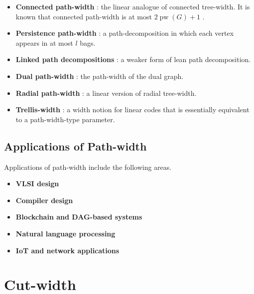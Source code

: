 \documentclass[10pt]{book}
\theoremstyle{definition}
\DeclareMathOperator{\pw}{pw}
\begin{document}
\begin{itemize}
    \item \textbf{Connected path-width} \cite{316}: the linear analogue of connected tree-width.  
    It is known that connected path-width is at most \(2\pw(G)+1\) \cite{dereniowski2012pathwidth}.

    \item \textbf{Persistence path-width} \cite{317}: a path-decomposition in which each vertex appears in at most \(l\) bags.

    \item \textbf{Linked path decompositions} \cite{362}: a weaker form of lean path decomposition.

    \item \textbf{Dual path-width} \cite{425}: the path-width of the dual graph.

    \item \textbf{Radial path-width} \cite{albrechtsen2023structural}: a linear version of radial tree-width.

    \item \textbf{Trellis-width} \cite{Kashyap2007MatroidPA,Fomin2016OnIP}: a width notion for linear codes that is essentially equivalent to a path-width-type parameter.
\end{itemize}

\subsection{Applications of Path-width}

Applications of path-width include the following areas.

\begin{itemize}
    \item \textbf{VLSI design} \cite{ohtsuki1979one,mohring1995vlsi,Mhring1990GraphPR}
    \item \textbf{Compiler design} \cite{bodlaender1998linear,Conrado2023TheBP}
    \item \textbf{Blockchain and DAG-based systems} \cite{kawahara2024graph,kasahara2023dag}
    \item \textbf{Natural language processing} \cite{KornaiTuza1992}
    \item \textbf{IoT and network applications} \cite{aloisio2024coverage,aloisio2024parameterized}
\end{itemize}

\section{Cut-width}
\end{document}
